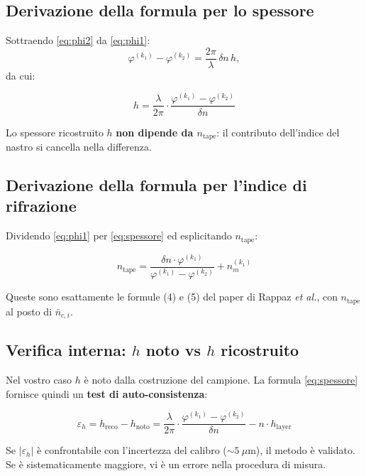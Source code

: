 \subsection{Derivazione della formula per lo spessore}

Sottraendo \eqref{eq:phi2} da \eqref{eq:phi1}:
\[
  \varphi^{(k_1)} - \varphi^{(k_2)}
  = \frac{2\pi}{\lambda}\,\delta n\, h,
\]
da cui:

\begin{equation}
  h = \frac{\lambda}{2\pi}\cdot
  \frac{\varphi^{(k_1)} - \varphi^{(k_2)}}{\delta n}
  \tag{5$'$}
  \label{eq:spessore}
\end{equation}

Lo spessore ricostruito $h$ \textbf{non dipende da $n_\text{tape}$}:
il contributo dell'indice del nastro si cancella nella differenza.

\subsection{Derivazione della formula per l'indice di rifrazione}

Dividendo \eqref{eq:phi1} per \eqref{eq:spessore} ed esplicitando $n_\text{tape}$:

\begin{equation}
  n_\text{tape} = \frac{\delta n\cdot\varphi^{(k_1)}}
  {\varphi^{(k_1)} - \varphi^{(k_2)}} + n_m^{(k_1)}
  \tag{4$'$}
  \label{eq:indice}
\end{equation}

Queste sono esattamente le formule (4) e (5) del paper di Rappaz \textit{et al.},
con $n_\text{tape}$ al posto di $\bar{n}_{c,i}$.

\subsection{Verifica interna: $h$ noto vs $h$ ricostruito}

Nel vostro caso $h$ è noto dalla costruzione del campione. La formula
\eqref{eq:spessore} fornisce quindi un \textbf{test di auto-consistenza}:

\[
  \varepsilon_h = h_\text{reco} - h_\text{noto}
  = \frac{\lambda}{2\pi}\cdot\frac{\varphi^{(k_1)}-\varphi^{(k_2)}}{\delta n}
  - n\cdot h_\text{layer}
\]

Se $|\varepsilon_h|$ è confrontabile con l'incertezza del calibro
($\sim 5\ \mu\text{m}$), il metodo è validato. Se è sistematicamente
maggiore, vi è un errore nella procedura di misura.

